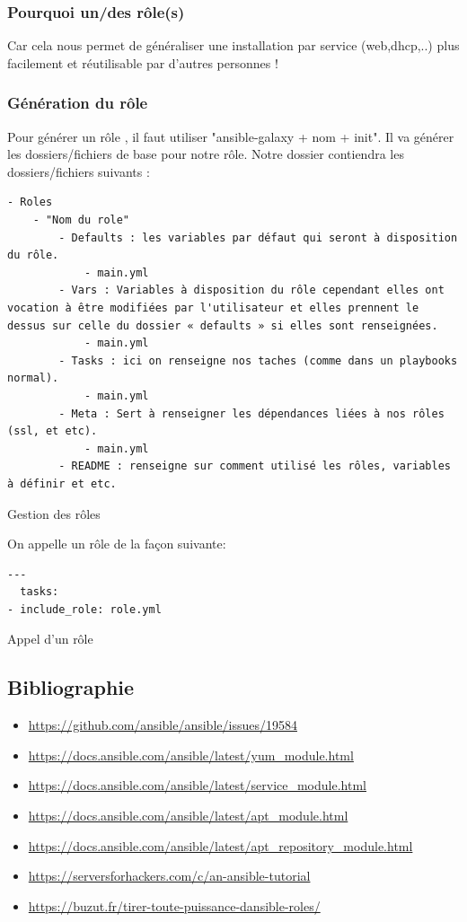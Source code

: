 \documentclass[a4paper, 12pt]{article}
\newenvironment{code}{\captionsetup{type=listing}}{}
\begin{document}
\subsubsection{Pourquoi un/des rôle(s)}
Car cela nous permet de généraliser une installation par service (web,dhcp,..) plus facilement et réutilisable
par d'autres personnes !

\subsubsection{Génération du rôle}
Pour générer un rôle , il faut utiliser "ansible-galaxy + nom + init". Il va générer les dossiers/fichiers de
base pour notre rôle. Notre dossier contiendra les dossiers/fichiers suivants :
\begin{code}
    \begin{verbatim}
- Roles
    - "Nom du role"
        - Defaults : les variables par défaut qui seront à disposition du rôle.
            - main.yml
        - Vars : Variables à disposition du rôle cependant elles ont vocation à être modifiées par l'utilisateur et elles prennent le dessus sur celle du dossier « defaults » si elles sont renseignées.
            - main.yml
        - Tasks : ici on renseigne nos taches (comme dans un playbooks normal).
            - main.yml
        - Meta : Sert à renseigner les dépendances liées à nos rôles (ssl, et etc).
            - main.yml
        - README : renseigne sur comment utilisé les rôles, variables à définir et etc.
    \end{verbatim}
    \caption{Gestion des rôles}
    \label{gestion_roles}
\end{code}
\bigbreak
On appelle un rôle de la façon suivante:
\begin{code}
    \begin{verbatim}
---
  tasks:
- include_role: role.yml
    \end{verbatim}
    \caption{Appel d'un rôle}
    \label{appel_role}
\end{code}
\bigbreak

\subsection{Bibliographie}
\begin{itemize}
    \item \url{https://github.com/ansible/ansible/issues/19584}
    \item \url{https://docs.ansible.com/ansible/latest/yum_module.html}
    \item \url{https://docs.ansible.com/ansible/latest/service_module.html}
    \item \url{https://docs.ansible.com/ansible/latest/apt_module.html}
    \item \url{https://docs.ansible.com/ansible/latest/apt_repository_module.html}
    \item \url{https://serversforhackers.com/c/an-ansible-tutorial}
    \item \url{https://buzut.fr/tirer-toute-puissance-dansible-roles/}
\end{itemize}
\end{document}
